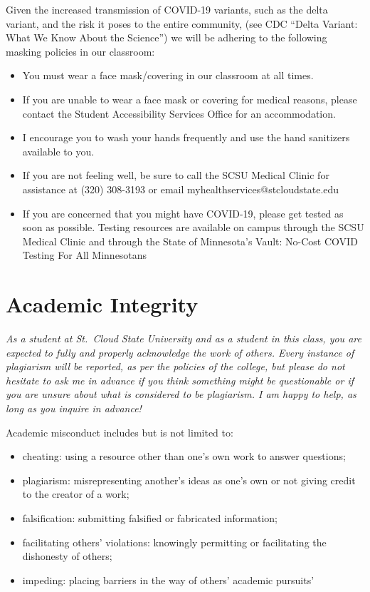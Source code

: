 \documentclass{tufte-handout}
\begin{document}
\begin{fullwidth}


Given the increased transmission of COVID-19 variants, such as the delta variant, and the risk it poses to the entire community, (see CDC ``Delta Variant: What We Know About the Science'') we will be adhering to the following masking policies in our classroom:

\begin{itemize}
\item You must wear a face mask/covering in our classroom at all times. 
\item If you are unable to wear a face mask or covering for medical reasons,
please contact the Student Accessibility Services Office for an
accommodation. 
\item I encourage you to wash your hands frequently and use the hand
sanitizers available to you.
\item If you are not feeling well, be sure to call the SCSU Medical Clinic for
assistance at (320) 308-3193 or email
myhealthservices@stcloudstate.edu
\item If you are concerned that you might have COVID-19, please get tested as
soon as possible. Testing resources are available on campus through the
SCSU Medical Clinic and through the State of Minnesota’s Vault: No-Cost
COVID Testing For All Minnesotans
\end{itemize}


\section{Academic Integrity}



\emph{As a student at St.\ Cloud State University and as a student in this class, you are expected to fully and properly acknowledge the work of others. Every instance of plagiarism will be reported, as per the policies of the college, but please do not hesitate to ask me in advance if you think something might be questionable or if you are unsure about what is considered to be plagiarism. I am happy to help, as long as you inquire in advance! }

Academic misconduct includes but is not limited to:

\begin{itemize}
	\item cheating: using a resource other than one's own work to answer questions;
	\item plagiarism: misrepresenting another's ideas as one's own or not giving credit to the creator of a work;
	\item falsification: submitting falsified or fabricated information;
	\item facilitating others' violations: knowingly permitting or facilitating the dishonesty of others;
	\item impeding: placing barriers in the way of others' academic pursuits'
\end{itemize}


\end{fullwidth}
\end{document}
